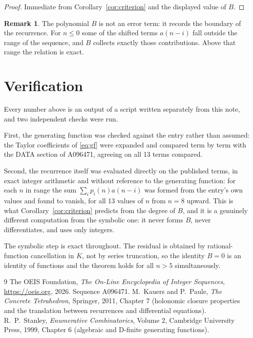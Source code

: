 \documentclass[11pt,a4paper]{article}
\theoremstyle{plain}
\theoremstyle{definition}
\newtheorem{remark}[theorem]{Remark}
\begin{document}
\begin{proof}
Immediate from Corollary~\ref{cor:criterion} and the displayed value of $B$.
\end{proof}

\begin{remark}
The polynomial $B$ is not an error term: it records the boundary of the recurrence. For
$n\le0$ some of the shifted terms $a(n-i)$ fall outside the range of the sequence,
and $B$ collects exactly those contributions. Above that range the relation is exact.
\end{remark}

\section{Verification}

Every number above is an output of a script written separately from this note, and two
independent checks were run.

First, the generating function was checked against the entry rather than assumed: the
Taylor coefficients of \eqref{eq:gf} were expanded and compared term by term with the DATA
section of A096471, agreeing on all 13 terms compared.

Second, the recurrence itself was evaluated directly on the published terms, in exact
integer arithmetic and without reference to the generating function: for each $n$ in range
the sum $\sum_{i}p_{i}(n)a(n-i)$ was formed from the entry's own values and found to
vanish, for all 13 values of $n$ from $n=8$ upward. This is what
Corollary~\ref{cor:criterion} predicts from the degree of $B$, and it is a genuinely
different computation from the symbolic one: it never forms $B$, never differentiates, and
uses only integers.

The symbolic step is exact throughout. The residual is obtained by rational-function
cancellation in $K$, not by series truncation, so the identity $B=0$ is an
identity of functions and the theorem holds for all $n>5$ simultaneously.

\begin{thebibliography}{9}
 The OEIS Foundation, \emph{The On-Line Encyclopedia of Integer Sequences},
\url{https://oeis.org}, 2026. Sequence A096471.
 M.~Kauers and P.~Paule, \emph{The Concrete Tetrahedron}, Springer, 2011,
Chapter 7 (holonomic closure properties and the translation between recurrences and
differential equations).
 R.~P.~Stanley, \emph{Enumerative Combinatorics}, Volume 2, Cambridge
University Press, 1999, Chapter 6 (algebraic and D-finite generating functions).
\end{thebibliography}
\end{document}
